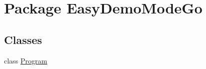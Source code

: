 \hypertarget{namespace_easy_demo_mode_go}{}\section{Package Easy\+Demo\+Mode\+Go}
\label{namespace_easy_demo_mode_go}
\subsection*{Classes}
\begin{DoxyCompactItemize}
\item 
class \hyperlink{class_easy_demo_mode_go_1_1_program}{Program}
\end{DoxyCompactItemize}
